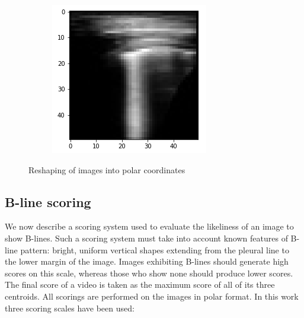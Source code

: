 \documentclass[12pt]{article} %
\begin{document}
\begin{figure}
\begin{subfigure}{0.35\textwidth}
		\caption{}
		\end{subfigure}
		\begin{subfigure}{0.30\textwidth}
		\includegraphics[width=\textwidth]{figuras/polar.png}
		\caption{}
		\end{subfigure}
	\caption{Reshaping of images into polar coordinates}
	\end{figure}
	

\subsection{B-line scoring}

	We now describe a scoring system used to evaluate the likeliness of an image to show B-lines. Such a scoring system must take into account known features of B-line pattern: bright, uniform vertical shapes extending from the pleural line to the lower margin of the image. Images exhibiting B-lines should generate high scores on this scale, whereas those who show none should produce lower scores. The final score of a video is taken as the maximum score of all of its three centroids. All scorings are performed on the images in polar format. In this work three scoring scales have been used:
	
\end{document}
